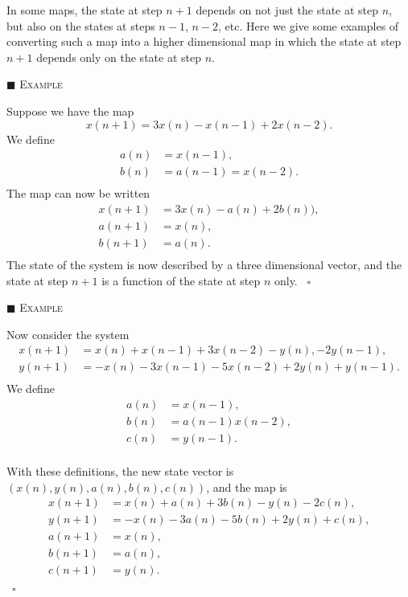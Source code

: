 \documentclass[reqno]{immbook}
\numberwithin{equation}{chapter}
\numberwithin{question}{section}
\numberwithin{theorem}{chapter}
\numberwithin{figure}{chapter}
\theoremstyle{definition}
\newenvironment{xexample}%
{%

\medskip\noindent\addtocounter{example}{1}$\blacksquare$ \textsc{Example \theexample}\hspace*{1em}%
}%
{%
~\hfill$\square$

\medskip
}
\begin{document}
In some maps, the state at step $n+1$ depends on not just the state at step $n$,
but also on the states at steps $n-1$, $n-2$, etc.
Here we give some examples of
converting such a map into a higher dimensional map in which the state at
step $n+1$ depends only on the state at step $n$.
\begin{xexample}
Suppose we have the map
\begin{equation}
   x(n+1) = 3x(n)-x(n-1)+2x(n-2).
\end{equation}
We define
\begin{equation}
\begin{split}
   a(n) & = x(n-1), \\
   b(n) & = a(n-1) = x(n-2). \\
\end{split}
\end{equation}
The map can now be written
\begin{equation}
\begin{split}
   x(n+1) & = 3x(n)-a(n)+2b(n)), \\
   a(n+1) & = x(n), \\
   b(n+1) & = a(n). \\
\end{split}
\end{equation}
The state of the system is now described by a three dimensional vector,
and the state at step $n+1$ is a function of the state at step $n$ only.
\end{xexample}
\begin{xexample}
Now consider the system
\begin{equation}
\begin{split}
   x(n+1) & = x(n)+x(n-1)+3x(n-2)-y(n),-2y(n-1), \\
   y(n+1) & = -x(n)-3x(n-1)-5x(n-2)+2y(n)+y(n-1). \\
\end{split}
\end{equation}
We define
\begin{equation}
\begin{split}
   a(n) & = x(n-1), \\
   b(n) & = a(n-1) x(n-2), \\
   c(n) & = y(n-1). \\
\end{split}
\end{equation}


With these definitions,
the new state vector is $(x(n),y(n),a(n),b(n),c(n))$, and the map is
\begin{equation}
\begin{split}
   x(n+1) & = x(n) + a(n) + 3b(n) - y(n) - 2c(n), \\
   y(n+1) & = -x(n) - 3a(n) - 5b(n) + 2y(n) + c(n), \\
   a(n+1) & = x(n), \\
   b(n+1) & = a(n), \\
   c(n+1) & = y(n).
\end{split}
\end{equation}
\end{xexample}
\end{document}
